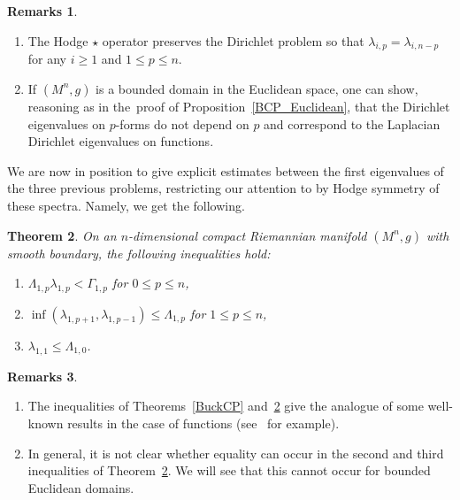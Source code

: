\documentclass[10pt,a4paper]{amsart}
\numberwithin{equation}{section}
\newtheorem{Theorem}{Theorem}[section]
\theoremstyle{definition}
\newtheorem{Remarks}[Theorem]{Remarks}
\begin{document}
\begin{Remarks}\quad%
\begin{enumerate}\itemsep=0pt
\item The Hodge $\star$ operator preserves the Dirichlet problem so that $\lambda_{i,p}=\lambda_{i,n-p}$ for any $i\geq 1$ and $1\leq p\leq n$.
\item If $(M^n,g)$ is a bounded domain in the Euclidean space, one can show, reasoning as in the~proof of Proposition~\ref{BCP_Euclidean}, that the Dirichlet eigenvalues on $p$-forms do not depend on $p$ and correspond to the Laplacian Dirichlet eigenvalues on functions.
\end{enumerate}
\end{Remarks}

We are now in position to give explicit estimates between the first eigenvalues of the three previous problems, restricting our attention to  by Hodge symmetry of these spectra.
Namely, we get the following.

\begin{Theorem}\label{BCP_Dirichlet}
On an $n$-dimensional compact Riemannian manifold $(M^n,g)$ with smooth boundary, the following inequalities hold:
\begin{enumerate}\itemsep=0pt
\item[$(1)$] $\Lambda_{1,p} \lambda_{1,p}< \Gamma_{1,p}$ for $0\leq p\leq n$,
\item[$(2)$] $\inf(\lambda_{1,p+1}, \lambda_{1,p-1}) \le \Lambda_{1,p}$ for $1\leq p\leq n$,
\item[$(3)$] $\lambda_{1,1}\leq \Lambda_{1,0}$.
\end{enumerate}
\end{Theorem}

\begin{Remarks}\quad
\begin{enumerate}\itemsep=0pt
\item The inequalities of Theorems~\ref{BuckCP} and~\ref{BCP_Dirichlet} give the analogue of some well-known results in the case of functions (see~\cite{AL} for example).
\item In general, it is not clear whether equality can occur in the second and third inequalities of Theorem~\ref{BCP_Dirichlet}.
We will see that this cannot occur for bounded Euclidean domains.
\end{enumerate}
\end{Remarks}
\end{document}
